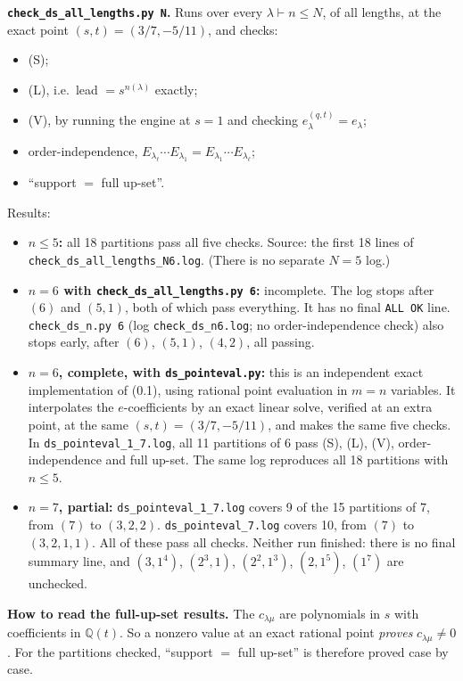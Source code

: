 \documentclass[11pt]{article}
\theoremstyle{definition}
\newcommand{\Q}{\mathbb{Q}}
\newcommand{\file}[1]{\texttt{#1}}
\begin{document}
\noindent\textbf{\file{check\_ds\_all\_lengths.py N}.} Runs over every $\lambda \vdash n \le N$, of all lengths, at the exact point $(s,t) = (3/7, -5/11)$, and checks:
\begin{itemize}
\item (S);
\item (L), i.e.\ lead $= s^{n(\lambda)}$ exactly;
\item (V), by running the engine at $s = 1$ and checking $e_\lambda^{(q,t)} = e_\lambda$;
\item order-independence, $E_{\lambda_\ell}\cdots E_{\lambda_1} = E_{\lambda_1}\cdots E_{\lambda_\ell}$;
\item ``support $=$ full up-set''.
\end{itemize}
Results:
{\sloppy
\begin{itemize}
\item \textbf{$n \le 5$:} all 18 partitions pass all five checks. Source: the first 18 lines of \file{check\_ds\_all\_lengths\_N6.log}. (There is no separate $N=5$ log.)
\item \textbf{$n = 6$ with \file{check\_ds\_all\_lengths.py 6}:} incomplete. The log stops after $(6)$ and $(5,1)$, both of which pass everything. It has no final \texttt{ALL OK} line. \file{check\_ds\_n.py 6} (log \file{check\_ds\_n6.log}; no order-independence check) also stops early, after $(6)$, $(5,1)$, $(4,2)$, all passing.
\item \textbf{$n = 6$, complete, with \file{ds\_pointeval.py}:} this is an independent exact implementation of (0.1), using rational point evaluation in $m = n$ variables. It interpolates the $e$-coefficients by an exact linear solve, verified at an extra point, at the same $(s,t) = (3/7,-5/11)$, and makes the same five checks. In \file{ds\_pointeval\_1\_7.log}, all 11 partitions of $6$ pass (S), (L), (V), order-independence and full up-set. The same log reproduces all 18 partitions with $n \le 5$.
\item \textbf{$n = 7$, partial:} \file{ds\_pointeval\_1\_7.log} covers 9 of the 15 partitions of $7$, from $(7)$ to $(3,2,2)$. \file{ds\_pointeval\_7.log} covers 10, from $(7)$ to $(3,2,1,1)$. All of these pass all checks. Neither run finished: there is no final summary line, and $(3,1^4)$, $(2^3,1)$, $(2^2,1^3)$, $(2,1^5)$, $(1^7)$ are unchecked.
\end{itemize}
\par}

\noindent\textbf{How to read the full-up-set results.} The $c_{\lambda\mu}$ are polynomials in $s$ with coefficients in $\Q(t)$. So a nonzero value at an exact rational point \emph{proves} $c_{\lambda\mu} \ne 0$. For the partitions checked, ``support $=$ full up-set'' is therefore proved case by case.
\end{document}
